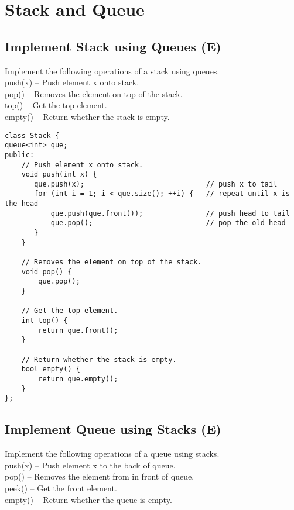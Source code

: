 \chapter{Stack and Queue}


\section{Implement Stack using Queues (E)}
Implement the following operations of a stack using queues.\\

    push(x) -- Push element x onto stack.\\
    pop() -- Removes the element on top of the stack.\\
    top() -- Get the top element.\\
    empty() -- Return whether the stack is empty.\\

\begin{lstlisting}
class Stack {
queue<int> que;
public:
    // Push element x onto stack.
    void push(int x) {
       que.push(x);                             // push x to tail
       for (int i = 1; i < que.size(); ++i) {   // repeat until x is the head
           que.push(que.front());               // push head to tail
           que.pop();                           // pop the old head
       }
    }

    // Removes the element on top of the stack.
    void pop() {
        que.pop();
    }

    // Get the top element.
    int top() {
        return que.front();
    }

    // Return whether the stack is empty.
    bool empty() {
        return que.empty();
    }
};
\end{lstlisting}


\section{Implement Queue using Stacks (E)}
 Implement the following operations of a queue using stacks.\\

    push(x) -- Push element x to the back of queue.\\
    pop() -- Removes the element from in front of queue.\\
    peek() -- Get the front element.\\
    empty() -- Return whether the queue is empty.\\
    
